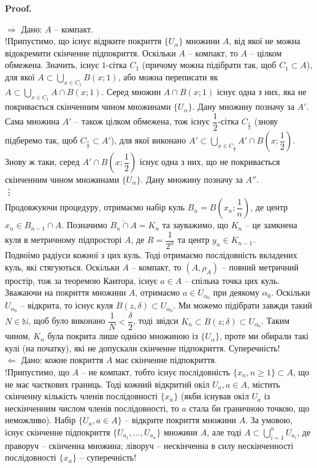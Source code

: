 \documentclass[a4paper, 10pt]{article}
\makeatletter
\def\rightproof{$\boxed{\Rightarrow}$ }
\def\leftproof{$\boxed{\Leftarrow}$ }
\theoremstyle{theoremdd}
\theoremstyle{theoremdd}
\theoremstyle{theoremdd}
\theoremstyle{theoremdd}
\theoremstyle{theoremdd}
\theoremstyle{theoremdd}
\theoremstyle{theoremdd}
\theoremstyle{theoremdd}
\renewenvironment{proof}[1][Proof.\\]{\par
\pushQED{\hfill \qed}%
\normalfont \topsep6\p@\@plus6\p@\relax
\trivlist
\item\relax
{\bfseries
#1\@addpunct{.}}\hspace\labelsep\ignorespaces
}{%
\popQED\endtrivlist\@endpefalse
}
\makeatother
\begin{document}
\begin{proof}
\rightproof Дано: $A$ -- компакт.\\
!Припустимо, що існує відрките покриття $\{U_\alpha\}$ множини $A$, від якої не можна відокремити скінченне підпокриття. Оскільки $A$ -- компакт, то $A$ -- цілком обмежена. Значить, існує $1$-сітка $C_1$ (причому можна підібрати так, щоб $C_1 \subset A$), для якої $A \subset \displaystyle\bigcup_{x \in C_1} B(x;1)$, або можна переписати як $A \subset \displaystyle\bigcup_{x \in C_1} A \cap B(x;1)$. Серед множин $A \cap B(x;1)$ існує одна з них, яка не покривається скінченним чином множинами $\{U_\alpha\}$. Дану множину позначу за $A'$.\\
Сама множина $A'$ -- також цілком обмежена, тож існує $\dfrac{1}{2}$-сітка $C_{\frac{1}{2}}$ (знову підберемо так, щоб $C_{\frac{1}{2}} \subset A'$), для якої виконано $A' \subset \displaystyle\bigcup_{x \in C_{\frac{1}{2}}} A' \cap B\left(x; \dfrac{1}{2}\right)$. Знову ж таки, серед $A' \cap B\left(x; \dfrac{1}{2}\right)$ існує одна з них, що не покривається скінченним чином множинами $\{U_\alpha\}$. Дану множину позначу за $A''$. \\
\vdots \\
Продовжуючи процедуру, отримаємо набір куль $B_n = B\left(x_n;\dfrac{1}{n}\right)$, де центр $x_n \in B_{n-1} \cap A$. Позначимо $\overline{B_n \cap A} = K_n$ та зауважимо, що $K_n$ -- це замкнена куля в метричному підпросторі $A$, де $R = \dfrac{1}{2^n}$ та центр $y_n \in K_{n-1}$.\\
Подвоїмо радіуси кожної з цих куль. Тоді отримаємо послідовність вкладених куль, які стягуються. Оскільки $A$ -- компакт, то $(A,\rho_A)$ -- повний метричний простір, тож за теоремою Кантора, існує $a \in A$ -- спільна точка цих куль. Зважаючи на покриття множини $A$, отримаємо $a \in U_{\alpha_0}$ при деякому $\alpha_0$. Оскільки $U_{\alpha_0}$ -- відкрита, то існує куля $B(z,\delta) \subset U_{\alpha_0}$. Ми можемо підібрати завжди такий $N \in \mathbb{N}$, щоб було виконано $\dfrac{1}{N} < \dfrac{\delta}{2}$, тоді звідси $K_n \subset B(z;\delta) \subset U_{\alpha_0}$. Таким чином, $K_n$ була покрита лише однією множиною із $\{U_\alpha\}$, проте ми обирали такі кулі (на початку), які не допускали скінченне підпокриття. Суперечність!
\bigskip \\
\leftproof Дано: кожне покриття $A$ має скінченне підпокриття.\\
!Припустимо, що $A$ -- не компакт, тобто існує послідовність $\{x_n, n \geq 1\} \subset A$, що не має часткових границь. Тоді кожний відкритий окіл $U_a, a \in A$, містить скінченну кількість членів послідовності $\{x_n\}$ (якби існував окіл $U_a$ із нескінченним числом членів послідовності, то $a$ стала би граничною точкою, що неможливо). Набір $\{U_a, a \in A\}$ -- відкрите покриття множини $A$. За умовою, існує скінченне підпокриття $\{U_{a_1},\dots,U_{a_n}\}$ множини $A$, але тоді $A \subset \displaystyle\bigcup_{i=1}^n U_{a_i}$, де праворуч -- скінченна множина; ліворуч -- нескінченна в силу нескінченності послідовності $\{x_n\}$ -- суперечність!
\end{proof}
\end{document}
